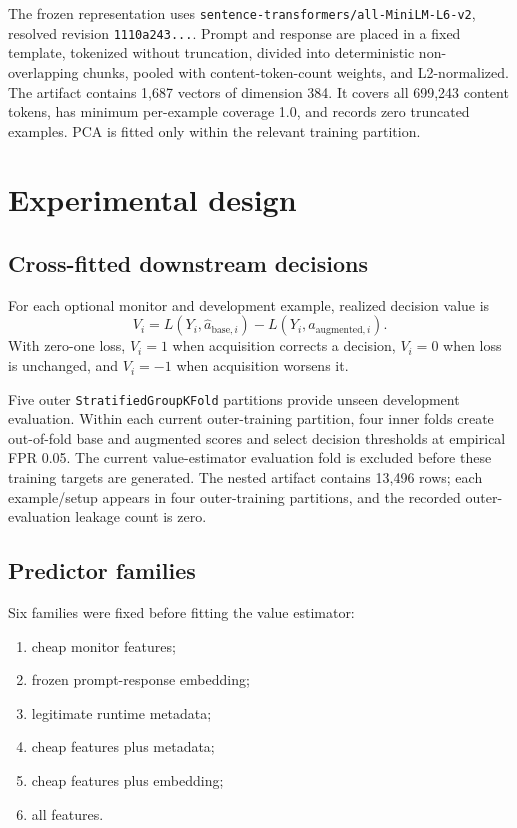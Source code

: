 \documentclass[11pt,a4paper]{article}
\newcommand{\code}[1]{\texttt{#1}}
\begin{document}
The frozen representation uses \code{sentence-transformers/all-MiniLM-L6-v2}, resolved revision \code{1110a243...}. Prompt and response are placed in a fixed template, tokenized without truncation, divided into deterministic non-overlapping chunks, pooled with content-token-count weights, and L2-normalized. The artifact contains 1,687 vectors of dimension 384. It covers all 699,243 content tokens, has minimum per-example coverage 1.0, and records zero truncated examples. PCA is fitted only within the relevant training partition.

\section{Experimental design}

\subsection{Cross-fitted downstream decisions}

For each optional monitor and development example, realized decision value is
\begin{equation}
V_i=L(Y_i,\widehat a_{\mathrm{base},i})-L(Y_i,\widehat a_{\mathrm{augmented},i}).
\end{equation}
With zero-one loss, $V_i=1$ when acquisition corrects a decision, $V_i=0$ when loss is unchanged, and $V_i=-1$ when acquisition worsens it.

Five outer \code{StratifiedGroupKFold} partitions provide unseen development evaluation. Within each current outer-training partition, four inner folds create out-of-fold base and augmented scores and select decision thresholds at empirical FPR 0.05. The current value-estimator evaluation fold is excluded before these training targets are generated. The nested artifact contains 13,496 rows; each example/setup appears in four outer-training partitions, and the recorded outer-evaluation leakage count is zero.

\subsection{Predictor families}

Six families were fixed before fitting the value estimator:

\begin{enumerate}
  \item cheap monitor features;
  \item frozen prompt-response embedding;
  \item legitimate runtime metadata;
  \item cheap features plus metadata;
  \item cheap features plus embedding;
  \item all features.
\end{enumerate}
\end{document}
